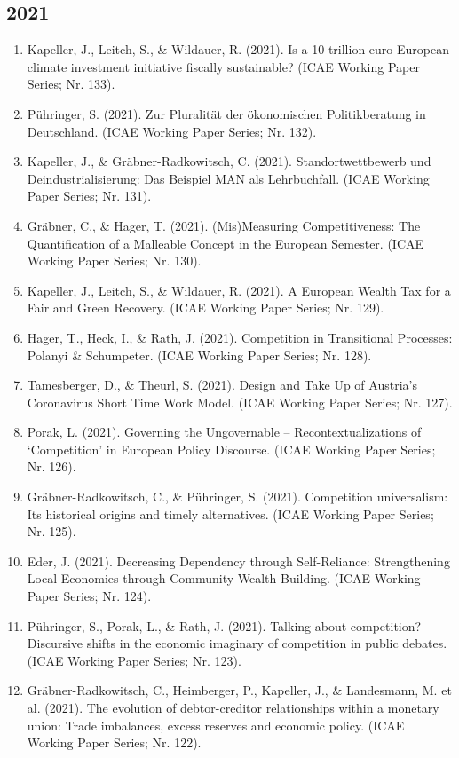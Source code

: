 \subsection*{2021}
\begin{enumerate}
	 \item Kapeller, J., Leitch, S., \& Wildauer, R. (2021). Is a 10 trillion euro European climate investment initiative fiscally sustainable? (ICAE Working Paper Series; Nr. 133).
	 \item Pühringer, S. (2021). Zur Pluralität der ökonomischen Politikberatung in Deutschland. (ICAE Working Paper Series; Nr. 132).
	 \item Kapeller, J., \& Gräbner-Radkowitsch, C. (2021). Standortwettbewerb und Deindustrialisierung: Das Beispiel MAN als Lehrbuchfall. (ICAE Working Paper Series; Nr. 131).
	 \item Gräbner, C., \& Hager, T. (2021). (Mis)Measuring Competitiveness: The Quantification of a Malleable Concept in the European Semester. (ICAE Working Paper Series; Nr. 130).
	 \item Kapeller, J., Leitch, S., \& Wildauer, R. (2021). A European Wealth Tax for a Fair and Green Recovery. (ICAE Working Paper Series; Nr. 129).
	 \item Hager, T., Heck, I., \& Rath, J. (2021). Competition in Transitional Processes: Polanyi \& Schumpeter. (ICAE Working Paper Series; Nr. 128).
	 \item Tamesberger, D., \& Theurl, S. (2021). Design and Take Up of Austria’s Coronavirus Short Time Work Model. (ICAE Working Paper Series; Nr. 127).
	 \item Porak, L. (2021). Governing the Ungovernable -- Recontextualizations of ‘Competition’ in European Policy Discourse. (ICAE Working Paper Series; Nr. 126).
	 \item Gräbner-Radkowitsch, C., \& Pühringer, S. (2021). Competition universalism: Its historical origins and timely alternatives. (ICAE Working Paper Series; Nr. 125).
	 \item Eder, J. (2021). Decreasing Dependency through Self-Reliance: Strengthening Local Economies through Community Wealth Building. (ICAE Working Paper Series; Nr. 124).
	 \item Pühringer, S., Porak, L., \& Rath, J. (2021). Talking about competition? Discursive shifts in the economic imaginary of competition in public debates. (ICAE Working Paper Series; Nr. 123).
	 \item Gräbner-Radkowitsch, C., Heimberger, P., Kapeller, J., \& Landesmann, M. et al. (2021). The evolution of debtor-creditor relationships within a monetary union: Trade imbalances, excess reserves and economic policy. (ICAE Working Paper Series; Nr. 122).
\end{enumerate}
